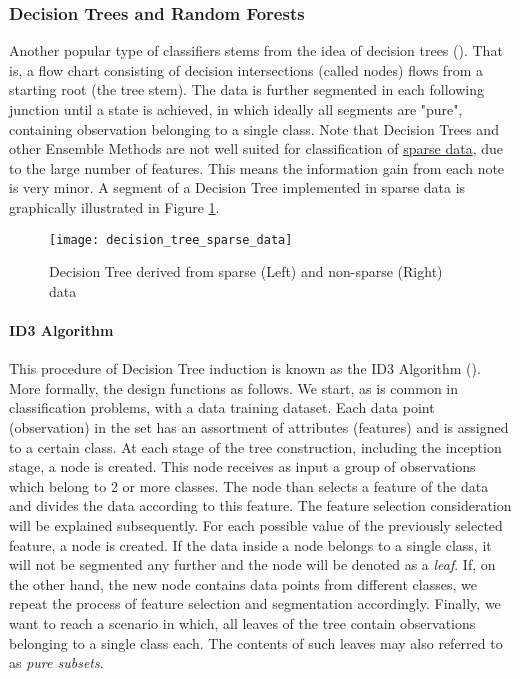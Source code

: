 \subsubsection{Decision Trees and Random Forests}
	Another popular type of classifiers stems from the idea of decision trees (\cite{quinlan2014c4}). That is, a flow chart consisting of decision intersections (called nodes) flows from a starting root (the tree stem). The data is further segmented in each following junction until a state is achieved, in which ideally all segments are "pure", containing observation belonging to a single class. Note that Decision Trees and other Ensemble Methods are not well suited for classification of \hyperref[data_sparsity]{sparse data}, due to the large number of features. This means the information gain from each note is very minor. A segment of a Decision Tree implemented in sparse data is graphically illustrated in Figure \ref{fig:rand_forest_sparse}.
	
	\begin{figure}[h]
		\centering
		\texttt{[image: decision\_tree\_sparse\_data]}
		\captionsetup{width=0.8\textwidth}
		\caption[Decision Tree with Sparse Data]{Decision Tree derived from sparse (Left) and non-sparse (Right) data}
		\label{fig:rand_forest_sparse}
	\end{figure}
		
	\paragraph{ID3 Algorithm} 
		This procedure of Decision Tree induction is known as the ID3 Algorithm (\cite{quinlan1986induction}). More formally, the design functions as follows. We start, as is common in classification problems, with a data training dataset. Each data point (observation) in the set has an assortment of attributes (features) and is assigned to a certain class. At each stage of the tree construction, including the inception stage, a node is created. This node receives as input a group of observations which belong to 2 or more classes. The node than selects a feature of the data and divides the data according to this feature. The feature selection consideration will be explained subsequently. For each possible value of the previously selected feature, a node is created. If the data inside a node belongs to a single class, it will not be segmented any further and the node will be denoted as a \textit{leaf}. If, on the other hand, the new node contains data points from different classes, we repeat the process of feature selection and segmentation accordingly. Finally, we want to reach a scenario in which, all leaves of the tree contain observations belonging to a single class each. The contents of such leaves may also referred to as \textit{pure subsets}.
		
